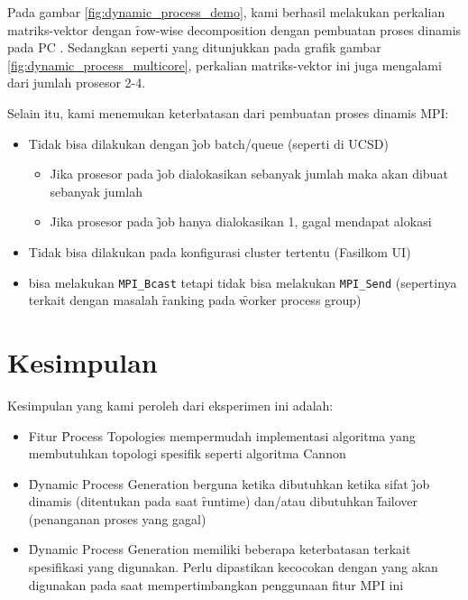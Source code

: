 Pada gambar \ref{fig:dynamic_process_demo}, kami berhasil melakukan perkalian matriks-vektor dengan \f{row-wise decomposition} dengan pembuatan proses dinamis pada PC . Sedangkan seperti yang ditunjukkan pada grafik gambar \ref{fig:dynamic_process_multicore}, perkalian matriks-vektor ini juga mengalami \speedup dari jumlah prosesor 2-4.

Selain itu, kami menemukan keterbatasan dari pembuatan proses dinamis MPI:

\begin{itemize}
	\item Tidak bisa dilakukan dengan \f{job batch/queue} (seperti di \cluster UCSD)
	\begin{itemize}
		\item Jika prosesor pada \f{job} dialokasikan sebanyak jumlah \worker maka \manager akan dibuat sebanyak jumlah \worker
		\item Jika prosesor pada \f{job} hanya dialokasikan 1, \worker gagal mendapat alokasi
	\end{itemize}
	\item Tidak bisa dilakukan pada konfigurasi cluster tertentu (\cluster Fasilkom UI)
	\item \Manager bisa melakukan \verb|MPI_Bcast| tetapi tidak bisa melakukan \verb|MPI_Send| (sepertinya terkait dengan masalah \f{ranking} pada \f{worker process group})	
\end{itemize}

\section{Kesimpulan}

Kesimpulan yang kami peroleh dari eksperimen ini adalah:

\begin{itemize}
	\item Fitur \f{Process Topologies} mempermudah implementasi algoritma yang membutuhkan topologi spesifik seperti algoritma Cannon
	\item \f{Dynamic Process Generation} berguna ketika dibutuhkan ketika sifat \f{job} dinamis (ditentukan pada saat \f{runtime}) dan/atau dibutuhkan \f{failover} (penanganan proses yang gagal)
	\item \f{Dynamic Process Generation} memiliki beberapa keterbatasan terkait spesifikasi \cluster yang digunakan. Perlu dipastikan kecocokan dengan \cluster yang akan digunakan pada saat mempertimbangkan penggunaan fitur MPI ini
\end{itemize}